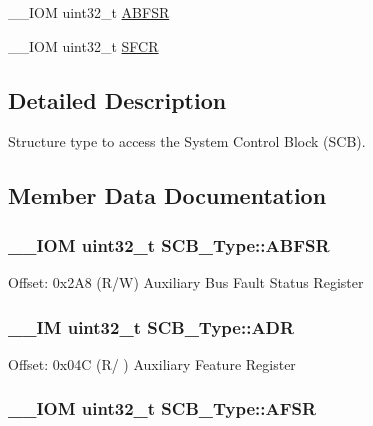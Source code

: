 \begin{DoxyCompactItemize}
\item 
\-\_\-\-\_\-\-I\-O\-M uint32\-\_\-t \hyperlink{struct_s_c_b___type_a35a95c9a21f43a569a7ac212acb4cee7}{A\-B\-F\-S\-R}
\item 
\-\_\-\-\_\-\-I\-O\-M uint32\-\_\-t \hyperlink{struct_s_c_b___type_a82273352d2e8c7a28a7b7cbdfc3d6a75}{S\-F\-C\-R}
\end{DoxyCompactItemize}


\subsection{Detailed Description}
Structure type to access the System Control Block (S\-C\-B). 

\subsection{Member Data Documentation}
\hypertarget{struct_s_c_b___type_a35a95c9a21f43a569a7ac212acb4cee7}{
\subsubsection[{A\-B\-F\-S\-R}]{\setlength{\rightskip}{0pt plus 5cm}\-\_\-\-\_\-\-I\-O\-M uint32\-\_\-t S\-C\-B\-\_\-\-Type\-::\-A\-B\-F\-S\-R}}\label{struct_s_c_b___type_a35a95c9a21f43a569a7ac212acb4cee7}
Offset\-: 0x2\-A8 (R/\-W) Auxiliary Bus Fault Status Register \hypertarget{struct_s_c_b___type_af084e1b2dad004a88668efea1dfe7fa1}{
\subsubsection[{A\-D\-R}]{\setlength{\rightskip}{0pt plus 5cm}\-\_\-\-\_\-\-I\-M uint32\-\_\-t S\-C\-B\-\_\-\-Type\-::\-A\-D\-R}}\label{struct_s_c_b___type_af084e1b2dad004a88668efea1dfe7fa1}
Offset\-: 0x04\-C (R/ ) Auxiliary Feature Register \hypertarget{struct_s_c_b___type_ab65372404ce64b0f0b35e2709429404e}{
\subsubsection[{A\-F\-S\-R}]{\setlength{\rightskip}{0pt plus 5cm}\-\_\-\-\_\-\-I\-O\-M uint32\-\_\-t S\-C\-B\-\_\-\-Type\-::\-A\-F\-S\-R}}\label{struct_s_c_b___type_ab65372404ce64b0f0b35e2709429404e}
